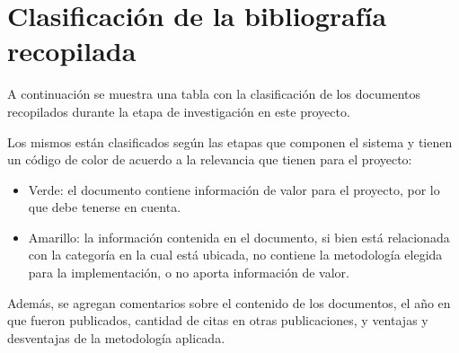 \chapter{Clasificación de la bibliografía recopilada}
\label{tablabiblio}
A continuación se muestra una tabla con la clasificación de los documentos recopilados durante la etapa de investigación en este proyecto.

Los mismos están clasificados según las etapas que componen el sistema y tienen un código de color de acuerdo a la relevancia que tienen para el proyecto:
\begin{itemize}
	\item Verde: el documento contiene información de valor para el proyecto, por lo que debe tenerse en cuenta.
	\item Amarillo: la información contenida en el documento, si bien está relacionada con la categoría en la cual está ubicada, no contiene la metodología elegida para la implementación, o no aporta información de valor. 
\end{itemize}

Además, se agregan comentarios sobre el contenido de los documentos, el año en que fueron publicados, cantidad de citas en otras publicaciones, y ventajas y desventajas de la metodología aplicada.


